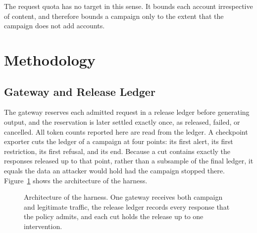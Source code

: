 \documentclass[conference]{IEEEtran}
\begin{document}
The request quota has no target in this sense. It bounds each account irrespective of content, and therefore bounds a campaign only to the extent that the campaign does not add accounts.

\section{Methodology}
\label{sec:method}
\subsection{Gateway and Release Ledger}
The gateway reserves each admitted request in a release ledger before generating output, and the reservation is later settled exactly once, as released, failed, or cancelled. All token counts reported here are read from the ledger. A checkpoint exporter cuts the ledger of a campaign at four points: its first alert, its first restriction, its first refusal, and its end. Because a cut contains exactly the responses released up to that point, rather than a subsample of the final ledger, it equals the data an attacker would hold had the campaign stopped there. Figure~\ref{fig:arch} shows the architecture of the harness.

\begin{figure}[!t]
\centering
{}
\caption{Architecture of the harness. One gateway receives both campaign and legitimate traffic, the release ledger records every response that the policy admits, and each cut holds the release up to one intervention.}
\label{fig:arch}
\end{figure}
\end{document}

